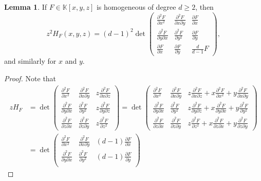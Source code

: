 \documentclass{article}
\newcommand{\K}{\mathbb{K}}
\theoremstyle{definition}
\newtheorem{lemma}[defn]{Lemma}
\begin{document}
\begin{lemma}
If $F\in\K[x,y,z]$ is homogeneous of degree $d\geq 2$, then
\[
z^2H_F(x,y,z)=(d-1)^2\det\begin{pmatrix}
\frac{\partial^2 F}{\partial x^2} & \frac{\partial^2 F}{\partial x\partial y} & \frac{\partial F}{\partial x} \\
\frac{\partial^2 F}{\partial y\partial x} & \frac{\partial^2 F}{\partial y^2} & \frac{\partial F}{\partial y} \\
\frac{\partial F}{\partial x} & \frac{\partial F}{\partial y} & \frac{d}{d-1}F
\end{pmatrix},
\]
and similarly for $x$ and $y$.
\end{lemma}
\begin{proof}
Note that
\[
\begin{aligned}
zH_F&=\det \begin{pmatrix}
\frac{\partial^2 F}{\partial x^2} & \frac{\partial^2 F}{\partial x\partial y} & z\frac{\partial^2 F}{\partial x\partial z} \\
\frac{\partial^2 F}{\partial y\partial x} & \frac{\partial^2 F}{\partial y^2} & z\frac{\partial^2 F}{\partial y\partial z} \\
\frac{\partial^2 F}{\partial z\partial x} & \frac{\partial^2 F}{\partial z\partial y} & z\frac{\partial^2 F}{\partial z^2}
\end{pmatrix}=\det \begin{pmatrix}
\frac{\partial^2 F}{\partial x^2} & \frac{\partial^2 F}{\partial x\partial y} & z\frac{\partial^2 F}{\partial x\partial z}+x\frac{\partial^2 F}{\partial x^2}+y\frac{\partial^2 F}{\partial x\partial y} \\
\frac{\partial^2 F}{\partial y\partial x} & \frac{\partial^2 F}{\partial y^2} & z\frac{\partial^2 F}{\partial y\partial z}+x\frac{\partial^2 F}{\partial y\partial x}+y\frac{\partial^2 F}{\partial y^2} \\
\frac{\partial^2 F}{\partial z\partial x} & \frac{\partial^2 F}{\partial z\partial y} & z\frac{\partial^2 F}{\partial z^2}+x\frac{\partial^2 F}{\partial z\partial x}+y\frac{\partial^2 F}{\partial z\partial y}
\end{pmatrix} \\
&=\det \begin{pmatrix}
\frac{\partial^2 F}{\partial x^2} & \frac{\partial^2 F}{\partial x\partial y} & (d-1)\frac{\partial F}{\partial x} \\
\frac{\partial^2 F}{\partial y\partial x} & \frac{\partial^2 F}{\partial y^2} & (d-1)\frac{\partial F}{\partial y} \\

\end{pmatrix}
\end{aligned}\]
\end{proof}
\end{document}
